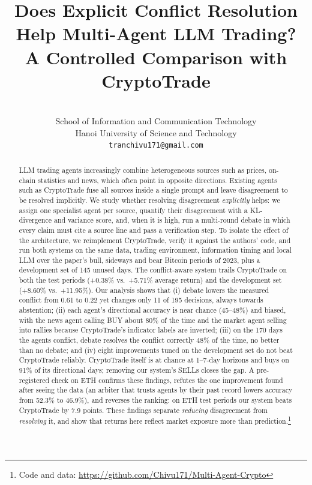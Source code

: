 \documentclass[11pt]{article}
\title{Does Explicit Conflict Resolution Help Multi-Agent LLM Trading?\\
A Controlled Comparison with CryptoTrade}
\author{\vn{Trần Chí Vũ} \\
  School of Information and Communication Technology \\
  Hanoi University of Science and Technology \\
  \texttt{tranchivu171@gmail.com}}
\begin{document}
\maketitle

\begin{abstract}
LLM trading agents increasingly combine heterogeneous sources such as prices, on-chain statistics and news, which
often point in opposite directions. Existing agents such as CryptoTrade fuse all sources inside a single prompt and
leave disagreement to be resolved implicitly. We study whether resolving disagreement \emph{explicitly} helps: we
assign one specialist agent per source, quantify their disagreement with a KL-divergence and variance score, and,
when it is high, run a multi-round debate in which every claim must cite a source line and pass a verification step.
To isolate the effect of the architecture, we reimplement CryptoTrade, verify it against the authors' code, and run
both systems on the same data, trading environment, information timing and local LLM over the paper's bull,
sideways and bear Bitcoin periods of 2023, plus a development set of 145 unused days. The conflict-aware system trails
CryptoTrade on both the test periods (+0.38\% vs.\ +5.71\% average return) and the development set (+8.60\% vs.\
+11.95\%). Our analysis shows that (i) debate lowers the measured conflict from 0.61 to 0.22 yet changes only 11 of 195
decisions, always towards abstention; (ii) each agent's directional accuracy is near chance (45--48\%) and biased, with
the news agent calling BUY about 80\% of the time and the market agent selling into rallies because CryptoTrade's
indicator labels are inverted; (iii) on the 170 days the agents conflict, debate resolves the conflict correctly 48\% of
the time, no better than no debate; and (iv) eight improvements tuned on the development set do not beat CryptoTrade
reliably. CryptoTrade itself is at chance at 1--7-day horizons and buys on 91\% of its directional days; removing our
system's SELLs closes the gap. A pre-registered check on ETH confirms these findings, refutes the one improvement found
after seeing the data (an arbiter that trusts agents by their past record lowers accuracy from 52.3\% to 46.9\%), and
reverses the ranking: on ETH test periods our system beats CryptoTrade by 7.9 points. These findings separate
\emph{reducing} disagreement from \emph{resolving} it, and show that returns here reflect market exposure more than
prediction.\footnote{Code and data:
\url{https://github.com/Chivu171/Multi-Agent-Crypto}}
\end{abstract}
\end{document}
